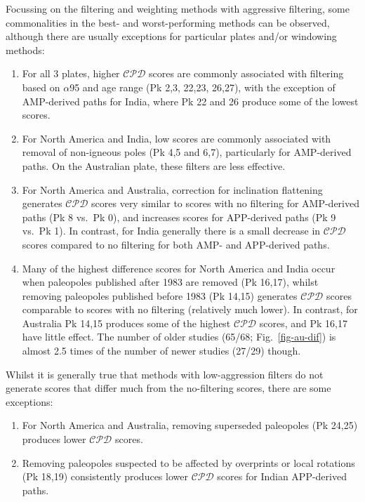 Focussing on the filtering and weighting methods with aggressive filtering,
some commonalities in the best- and worst-performing methods can be observed,
although there are usually exceptions for particular plates and/or windowing
methods:
%
\begin{enumerate}
  \item For all 3 plates, higher $\mathcal{CPD}$ scores are commonly associated
		with filtering based on $\alpha$95 and age range (Pk 2,3, 22,23, 26,27),
		with the exception of AMP-derived paths for India, where Pk 22 and 26
		produce some of the lowest scores.
  \item For North America and India, low scores are commonly associated with
		removal of non-igneous poles (Pk 4,5 and 6,7), particularly for
		AMP-derived paths. On the Australian plate, these filters are less
		effective.
  \item For North America and Australia, correction for inclination flattening
		generates $\mathcal{CPD}$ scores very similar to scores with no
		filtering for AMP-derived paths (Pk 8 vs.\ Pk 0), and increases
		scores for APP-derived paths (Pk 9 vs.\ Pk 1). In contrast, for
		India generally there is a small decrease in $\mathcal{CPD}$ scores
		compared to no filtering for both AMP- and APP-derived paths.
  \item Many of the highest difference scores for North America and India occur
		when paleopoles published after 1983 are removed (Pk 16,17), whilst
		removing paleopoles published before 1983 (Pk 14,15) generates
		$\mathcal{CPD}$ scores comparable to scores with no filtering
		(relatively much lower). In contrast, for Australia Pk 14,15
		produces some of the highest $\mathcal{CPD}$ scores, and Pk 16,17
		have little effect. The number of older studies (65/68;
		Fig.~\ref{fig-au-dif}) is almost 2.5 times of the number of newer
		studies (27/29) though.
\end{enumerate}

Whilst it is generally true that methods with low-aggression filters do not
generate scores that differ much from the no-filtering scores, there are some
exceptions:
%
\begin{enumerate}
  \item For North America and Australia, removing superseded paleopoles (Pk
		24,25) produces lower $\mathcal{CPD}$ scores.
  \item Removing paleopoles suspected to be affected by overprints or local
		rotations (Pk 18,19) consistently produces lower
		$\mathcal{CPD}$ scores for Indian APP-derived paths.
\end{enumerate}

